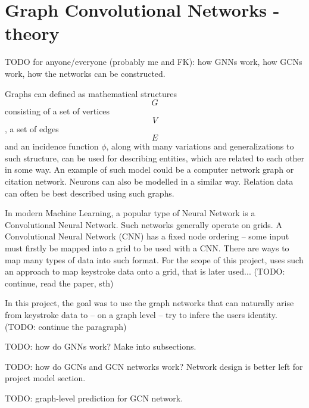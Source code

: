 
\chapter{Graph Convolutional Networks - theory}

TODO for anyone/everyone (probably me and FK): how GNNs work, how GCNs work, how the networks can be constructed.

Graphs can defined as mathematical structures $$G$$ consisting of a set of vertices $$V$$, a set of edges $$E$$ and an incidence function $\phi$, along with many variations and generalizations to such structure, can be used for describing entities, which are related to each other in some way. An example of such model could be a computer network graph or citation network. Neurons can also be modelled in a similar way. Relation data can often be best described using such graphs. \cite{Lesk2024}

In modern Machine Learning, a popular type of Neural Network is a Convolutional Neural Network. Such networks generally operate on grids. A Convolutional Neural Network (CNN) has a fixed node ordering -- some input must firstly be mapped into a grid to be used with a CNN. There are ways to map many types of data into such format. For the scope of this project, \cite{Shar2023} uses such an approach to map keystroke data onto a grid, that is later used... (TODO: continue, read the paper, sth)

In this project, the goal was to use the graph networks that can naturally arise from keystroke data to -- on a graph level -- try to infere the users identity. (TODO: continue the paragraph)

TODO: how do GNNs work? Make into subsections.

TODO: how do GCNs and GCN networks work? Network design is better left for project model section.

TODO: graph-level prediction for GCN network.